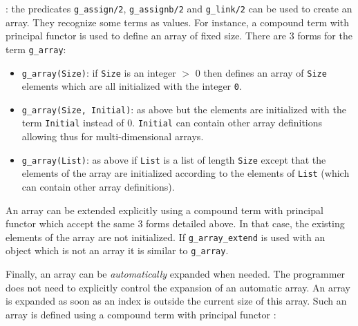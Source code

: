 : the predicates \texttt{g\_assign/2}, \texttt{g\_assignb/2}
and \texttt{g\_link/2}  can be used to create an
array. They recognize some terms as values. For instance, a compound term
with principal functor  is used to define an array of fixed
size.  There are 3 forms for the term \texttt{g\_array}:

\begin{itemize}

\item \texttt{g\_array(Size)}: if \texttt{Size} is an integer $>$ 0 then 
defines an array of \texttt{Size} elements which are all initialized with
the integer \texttt{0}.

\item \texttt{g\_array(Size, Initial)}: as above but the elements are
initialized with the term \texttt{Initial} instead of 0. \texttt{Initial}
can contain other array definitions allowing thus for multi-dimensional
arrays.

\item \texttt{g\_array(List)}: as above if \texttt{List} is a list of length
\texttt{Size} except that the elements of the array are initialized
according to the elements of \texttt{List} (which can contain other array
definitions). 

\end{itemize}

An array can be extended explicitly using a compound term with principal
functor  which accept the same 3 forms detailed
above. In that case, the existing elements of the array are not
initialized. If \texttt{g\_array\_extend} is used with an object which is not
an array it is similar to \texttt{g\_array}.

Finally, an array can be \textit{automatically} expanded when needed. The
programmer does not need to explicitly control the expansion of an automatic
array. An array is expanded as soon as an index is outside the current size
of this array. Such an array is defined using a compound term with principal
functor :


